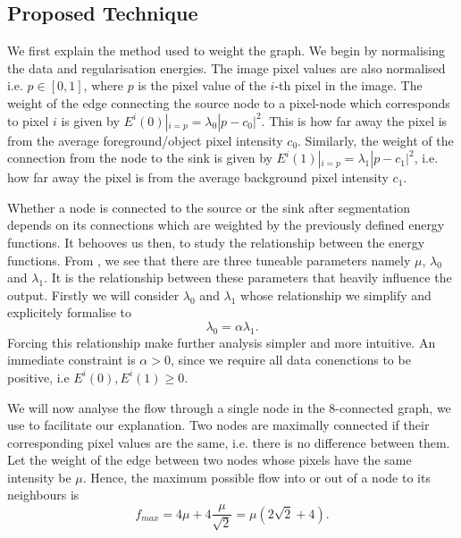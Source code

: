 \documentclass[10pt, journal, letterpaper, onecolumn, draftcls]{IEEEtran}
\begin{document}
\subsection{Proposed Technique}
We first explain the method used to weight the graph. We begin by normalising the data and regularisation energies.
The image pixel values are also normalised i.e. $p \in [0,1]$, where $p$ is the pixel value of the $i$-th pixel in the image. The weight of the edge connecting the source node to a pixel-node which corresponds to pixel $i$ is given by  $E^i(0)|_{i=p} = \lambda_0|p-c_0|^2$. This is how far away the pixel is from the average foreground/object pixel intensity $c_0$.  Similarly, the weight of the connection from the node to the sink is given by $E^i(1)|_{i=p}=\lambda_1|p-c_1|^2$, i.e. how far away the pixel is from the average background pixel intensity $c_1$.

Whether a node is connected to the source or the sink after segmentation depends on its connections which are weighted by the previously defined energy functions. It behooves us then, to study the relationship between the energy functions. From , we see that there are three tuneable parameters namely $\mu$, $\lambda_0$ and $\lambda_1$. It is the relationship between these parameters that heavily influence the output. Firstly we will consider $\lambda_0$ and $\lambda_1$ whose relationship we simplify and explicitely formalise to
\begin{equation}
	\lambda_0 = \alpha\lambda_1.
	\label{eq:l0l1dependancy}
\end{equation}
Forcing this relationship make further analysis simpler and more intuitive. An immediate constraint is $\alpha > 0$, since we require all data conenctions to be positive, i.e $E^i(0), E^i(1) \geq 0$.

We will now analyse the flow through a single node in the 8-connected graph, we use  to facilitate our explanation. Two nodes are maximally connected if their corresponding pixel values are the same, i.e. there is no difference between them. Let the weight of the edge between two nodes whose pixels have the same intensity be $\mu$. Hence, the maximum possible flow into or out of a node to its neighbours is
\begin{equation}
	f_{max} = 4\mu + 4\frac{\mu}{\sqrt{2}} = \mu \left( 2\sqrt{2} + 4\right).
	\label{eq:neighbourhoodsaturation}
\end{equation}
\end{document}
